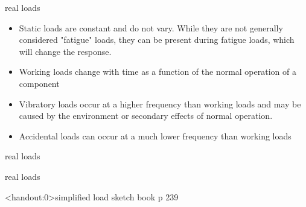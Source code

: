 \documentclass[10pt]{beamer}
\begin{document}
\begin{frame}{real loads}
	\begin{itemize}[<+->]
		\item Static loads are constant and do not vary. While they are not generally considered "fatigue" loads, they can be present during fatigue loads, which will change the response.
		\item Working loads change with time as a function of the normal operation of a component
		\item Vibratory loads occur at a higher frequency than working loads and may be caused by the environment or secondary effects of normal operation.
		\item Accidental loads can occur at a much lower frequency than working loads
	\end{itemize}
\end{frame}

\begin{frame}{real loads}
\end{frame}

\begin{frame}{real loads}
\end{frame}

\begin{frame}<handout:0>{simplified load}
	sketch book p 239
\end{frame}
\end{document}
